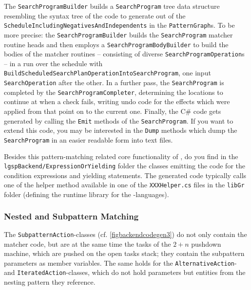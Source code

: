 The \texttt{Search\-Program\-Builder} builds a \texttt{Search\-Program} tree data structure resembling the syntax tree of the code to generate out of the \texttt{Schedule\-Including\-Negatives\-And\-Independents} in the \texttt{Pattern\-Graph}s. 
To be more precise: the \texttt{Search\-Program\-Builder} builds the \texttt{Search\-Program} matcher routine heads and then employs a \texttt{Search\-Program\-Body\-Builder} to build the bodies of the matcher routines -- consisting of diverse \texttt{Search\-Program\-Operation}s -- in a run over the schedule with \texttt{Build\-Scheduled\-Search\-Plan\-Operation\-Into\-Search\-Program}, one input \texttt{Search\-Operation} after the other. 
In a further pass, the \texttt{Search\-Program} is completed by the \texttt{Search\-Program\-Completer},
determining the locations to continue at when a check fails,
writing undo code for the effects which were applied from that point on to the current one.
Finally, the C\# code gets generated by calling the \texttt{Emit} methods of the \texttt{Search\-Program}.
If you want to extend this code, you may be interested in the \texttt{Dump} methods which dump the \texttt{Search\-Program} in an easier readable form into text files.

Besides this pattern-matching related core functionality of \GrG, do you find in the \texttt{lgsp\-Backend/Expression\-Or\-Yielding} folder the classes emitting the code for the condition expressions and yielding statements.
The generated code typically calls one of the helper method available in one of the \texttt{XXXHelper.cs} files in the \texttt{libGr} folder (defining the runtime library for the \GrG-languages).

\subsubsection*{Nested and Subpattern Matching}

The \texttt{Subpattern\-Action}-classes (cf. \ref{figbackendcodegen3}) do not only contain the matcher code, 
but are at the same time the tasks of the $2+n$ pushdown machine, which are pushed on the open tasks stack;
they contain the subpattern parameters as member variables.
The same holds for the \texttt{Alternative\-Action}- and \texttt{Iterated\-Action}-classes,
which do not hold parameters but entities from the nesting pattern they reference. 

